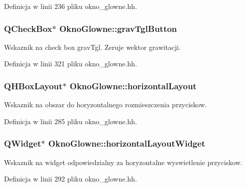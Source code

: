 Definicja w linii 236 pliku okno\-\_\-glowne.\-hh.

\hypertarget{class_okno_glowne_ae6e8681e77286aae1f4025ee5ba1ad69}{
\subsubsection[{grav\-Tgl\-Button}]{\setlength{\rightskip}{0pt plus 5cm}Q\-Check\-Box$\ast$ Okno\-Glowne\-::grav\-Tgl\-Button\hspace{0.3cm}{\ttfamily [private]}}}\label{class_okno_glowne_ae6e8681e77286aae1f4025ee5ba1ad69}
Wskaznik na check box grav\-Tgl. Zeruje wektor grawitacji. 

Definicja w linii 321 pliku okno\-\_\-glowne.\-hh.

\hypertarget{class_okno_glowne_aacb5ddb6d0eb560a47917cc1b457239a}{
\subsubsection[{horizontal\-Layout}]{\setlength{\rightskip}{0pt plus 5cm}Q\-H\-Box\-Layout$\ast$ Okno\-Glowne\-::horizontal\-Layout\hspace{0.3cm}{\ttfamily [private]}}}\label{class_okno_glowne_aacb5ddb6d0eb560a47917cc1b457239a}
Wskaznik na obszar do horyzontalnego rozmieszczenia przyciskow. 

Definicja w linii 285 pliku okno\-\_\-glowne.\-hh.

\hypertarget{class_okno_glowne_a12ac2d00b9ca186176ccc710a928a723}{
\subsubsection[{horizontal\-Layout\-Widget}]{\setlength{\rightskip}{0pt plus 5cm}Q\-Widget$\ast$ Okno\-Glowne\-::horizontal\-Layout\-Widget\hspace{0.3cm}{\ttfamily [private]}}}\label{class_okno_glowne_a12ac2d00b9ca186176ccc710a928a723}
Wskaznik na widget odpowiedzialny za horyzontalne wyswietlenie przyciskow. 

Definicja w linii 292 pliku okno\-\_\-glowne.\-hh.

